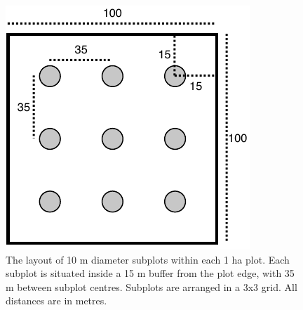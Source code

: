 \documentclass[11pt,a4paper]{article}
\begin{document}
\begin{figure}
	\includegraphics[width=0.5\linewidth]{plot}
	\caption{The layout of 10 m diameter subplots within each 1 ha plot. Each subplot is situated inside a 15 m buffer from the plot edge, with 35 m between subplot centres. Subplots are arranged in a 3x3 grid. All distances are in metres.}
	\label{subplot_plot}
\end{figure}
\end{document}
